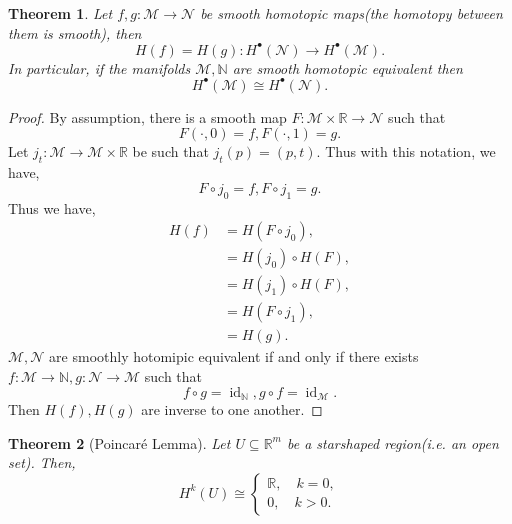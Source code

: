 \documentclass[10pt]{article}
\newtheorem{theorem}{Theorem} [section]
\DeclareMathOperator{\id}{id}
\newcommand{\N}[0]{\mathbb{N}}
\newcommand{\R}[0]{\mathbb{R}}
\newcommand{\M}[0]{\mathcal{M}}
\newcommand{\maniN}[0]{\mathcal{N}}
\begin{document}
\begin{theorem}
  Let $f,g:\M\to\maniN$ be smooth homotopic maps(the homotopy between them is smooth), then 
  \begin{equation*}
    H(f) = H(g):H^\bullet(\maniN)\to H^\bullet(\M).
  \end{equation*}
  In particular, if the manifolds $\M,\N$ are smooth homotopic equivalent then 
  \begin{equation*}
    H^\bullet(\M)\cong H^\bullet(\maniN).
  \end{equation*}
\end{theorem}
\begin{proof}
By assumption, there is a smooth map $F:\M\times\R\to\maniN$ such that 
\begin{equation*}
  F(\cdot,0) = f, F(\cdot,1) = g.
\end{equation*}
Let $j_t:\M\to\M\times\R$ be such that $j_t(p) = (p,t)$. Thus with this notation, we have,
\begin{equation*}
  F\circ j_0 = f,F\circ j_1 = g.
\end{equation*}
Thus we have,
\begin{align*}
  H(f) & = H(F\circ j_0),\\
  & = H(j_0)\circ H(F),\\
  & = H(j_1)\circ H(F), \\
  & = H(F\circ j_1),\\
  & = H(g).
\end{align*}
$\M,\maniN$ are smoothly hotomipic equivalent if and only if there exists $f:\M\to\N,g:\maniN\to\M$ such that 
\begin{equation*}
  f\circ g = \id_\N,g\circ f = \id_\M.
\end{equation*}
Then $H(f),H(g)$ are inverse to one another.
\end{proof}

\begin{theorem}[Poincaré Lemma]
  Let $U\subseteq\R^m$ be a starshaped region(i.e. an open set). Then, 
  \begin{equation*}
    H^k(U)\cong \begin{cases}
      \R,\quad k=0,\\
      0,\quad k>0.
    \end{cases}
  \end{equation*}
  \label{theorem_poincare_lemma}
\end{theorem}
\end{document}
